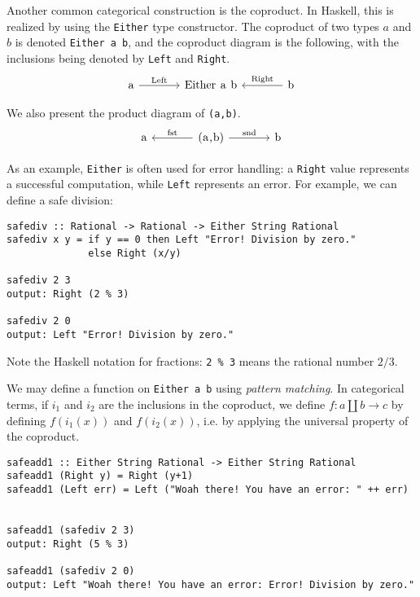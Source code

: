 \documentclass[11pt]{article}
\theoremstyle{nonumberplain}
\newcommand*\lsin{\lstinline}
\newcommand*\lsmath[1]{\text{\lstinline|#1|}}
\begin{document}
Another common categorical construction is the coproduct. In Haskell, this is realized by using the \lsin|Either| type constructor. The coproduct of two types $a$ and $b$ is denoted \lsin|Either a b|, and the coproduct diagram is the following, with the inclusions being denoted by \lsin|Left| and \lsin|Right|.
\begin{equation}
\begin{tikzcd}[column sep = large]
\lsmath{a} \arrow[r, "\lsmath{Left}"] & \lsmath{Either a b} & \lsmath{b} \arrow[l, "\lsmath{Right}"']
\end{tikzcd}
\end{equation}

We also present the product diagram of \lsin|(a,b)|.
\begin{equation}
\begin{tikzcd}[column sep=large]
\lsmath{a} & \lsmath{(a,b)} \arrow[l, "\lsmath{fst}"'] \arrow[r, "\lsmath{snd}"] & \lsmath{b} 
\end{tikzcd}
\end{equation}

As an example, \lsin|Either| is often used for error handling: a \lsin|Right| value represents a successful computation, while \lsin|Left| represents an error. For example, we can define a safe division:
\begin{lstlisting}
safediv :: Rational -> Rational -> Either String Rational
safediv x y = if y == 0 then Left "Error! Division by zero."
              else Right (x/y)
              
safediv 2 3
output: Right (2 % 3)

safediv 2 0
output: Left "Error! Division by zero."
\end{lstlisting}

Note the Haskell notation for fractions: \lsin|2 %

We may define a function on \lsin|Either a b| using \emph{pattern matching}. In categorical terms, if $i_1$ and $i_2$ are the inclusions in the coproduct, we define $f \colon a \amalg b \to c$ by defining $f(i_1(x))$ and $f(i_2(x))$, i.e. by applying the universal property of the coproduct.

\begin{lstlisting}
safeadd1 :: Either String Rational -> Either String Rational
safeadd1 (Right y) = Right (y+1)
safeadd1 (Left err) = Left ("Woah there! You have an error: " ++ err)


safeadd1 (safediv 2 3)
output: Right (5 % 3)

safeadd1 (safediv 2 0)
output: Left "Woah there! You have an error: Error! Division by zero."
\end{lstlisting}
\end{document}
